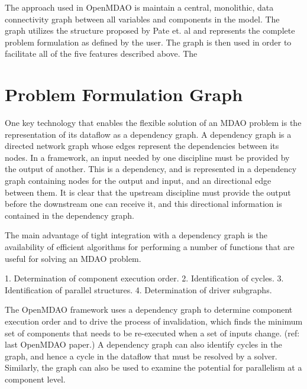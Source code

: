 \documentclass[]{aiaa-tc} %
\begin{document}
    The approach used in OpenMDAO is maintain a central, monolithic, data connectivity graph between all
    variables and components in the model. The graph utilizes the structure proposed by Pate et. al \cite{graph_problem2013}
    and represents the complete problem formulation as defined by the user. The graph is then used in order to
    facilitate all of the five features described above. The

  \section{Problem Formulation Graph}

    One key technology that enables the flexible solution of an MDAO problem is the representation
    of its dataflow as a dependency graph. A dependency graph is a directed network graph whose
    edges represent the dependencies between its nodes. In a framework, an input needed by one
    discipline must be provided by the output of another. This is a dependency, and is represented
    in a dependency graph containing nodes for the output and input, and an directional edge
    between them. It is clear that the upstream discipline must provide the output before the
    downstream one can receive it, and this directional information is contained in the dependency
    graph.

    The main advantage of tight integration with a dependency graph is the availability of efficient
    algorithms for performing a number of functions that are useful for solving an MDAO problem.

      1. Determination of component execution order.
      2. Identification of cycles.
      3. Identification of parallel structures.
      4. Determination of driver subgraphs.

    The OpenMDAO framework uses a dependency graph to determine component execution order and to
    drive the process of invalidation, which finds the minimum set of components that needs to
    be re-executed when a set of inputs change. (ref: last OpenMDAO paper.) A dependency graph
    can also identify cycles in the graph, and hence a cycle in the dataflow that must be resolved
    by a solver. Similarly, the graph can also be used to examine the potential for parallelism at
    a component level.
\end{document}
